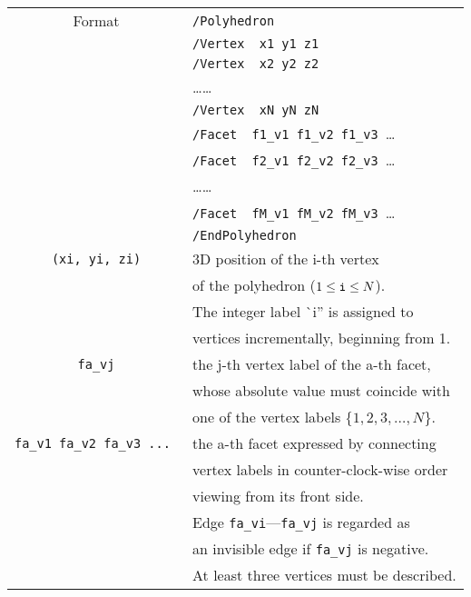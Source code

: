 \begin{tabular}{|c|l|}
\hline%
Format & \verb+/Polyhedron+\\
       & \verb+/Vertex  x1 y1 z1+\\
       & \verb+/Vertex  x2 y2 z2+\\
       & \ldots\ldots    \\
       & \verb+/Vertex  xN yN zN+\\
       & \verb+/Facet  f1_v1 f1_v2 f1_v3 +\ldots{}\\
       & \verb+/Facet  f2_v1 f2_v2 f2_v3 +\ldots{}\\
       & \ldots\ldots    \\
       & \verb+/Facet  fM_v1 fM_v2 fM_v3 +\ldots{}\\
       & \verb+/EndPolyhedron+\\
\hline%
\verb+(xi, yi, zi)+ & 3D position of the i-th vertex \\
                    & of the polyhedron ($1 \leq \verb+i+ \leq N$). \\
                    & The integer label ^^ i'' is assigned to \\
		    & vertices incrementally, beginning from 1.\\
\hline%
\verb+fa_vj+         & the j-th vertex label of the a-th facet, \\
                     & whose absolute value must coincide with \\
		     & one of the vertex labels  
		       \{$1, 2, 3, \ldots, N$\}.\\
\hline%
\verb+fa_v1 fa_v2 fa_v3 ... + & the a-th facet expressed by connecting \\
                   & vertex labels in counter-clock-wise order\\
                   & viewing from its front side.\\
                   & Edge \verb+fa_vi+---\verb+fa_vj+ is regarded as \\
                   & an invisible edge if \verb+fa_vj+ is negative. \\
		   & At least three vertices must be described.\\
\hline%
\end{tabular}
\vspace{.20in}


